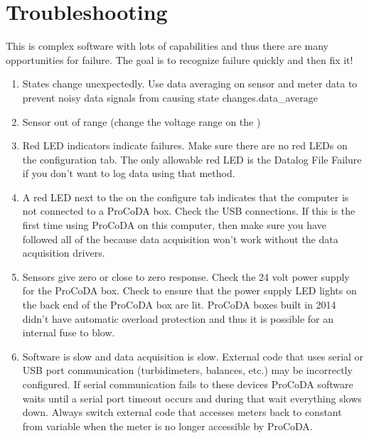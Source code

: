 \documentclass[letterpaper,10pt,english]{sphinxmanual}
\begin{document}
\section{Troubleshooting}
\label{\detokenize{ProCoDA/ProCoDA:troubleshooting}}\label{\detokenize{ProCoDA/ProCoDA:heading-procoda-troubleshooting}}
This is complex software with lots of capabilities and thus there are many opportunities for failure. The goal is to recognize failure quickly and then fix it!
\begin{enumerate}
\item {} 
States change unexpectedly. Use data averaging on sensor and meter data to prevent noisy data signals from causing state changes.\textbar{}data\_average\textbar{}

\item {} 
Sensor out of range (change the voltage range on the {\hyperref[\detokenize{ProCoDA/ProCoDA:heading-procoda-configure}]{}})

\item {} 
Red LED indicators indicate failures. Make sure there are no red LEDs on the configuration tab. The only allowable red LED is the Datalog File Failure if you don’t want to log data using that method.

\item {} 
A red LED next to the  on the configure tab indicates that the computer is not connected to a ProCoDA box. Check the USB connections. If this is the first time using ProCoDA on this computer, then make sure you have followed all of the  because data acquisition won’t work without the data acquisition drivers.

\item {} 
Sensors give zero or close to zero response. Check the 24 volt power supply for the ProCoDA box. Check to ensure that the power supply LED lights on the back end of the ProCoDA box are lit. ProCoDA boxes built in 2014 didn’t have automatic overload protection and thus it is possible for an internal fuse to blow.

\item {} 
Software is slow and data acquisition is slow. External code that uses serial or USB port communication (turbidimeters, balances, etc.) may be incorrectly configured. If serial communication fails to these devices ProCoDA software waits until a serial port timeout occurs and during that wait everything slows down. Always switch external code that accesses meters back to constant from variable when the meter is no longer accessible by ProCoDA.

\end{enumerate}
\end{document}
